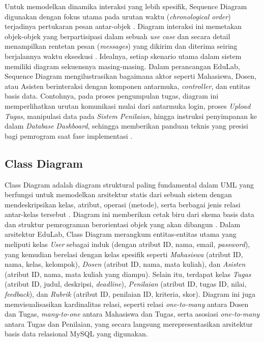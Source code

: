\documentclass[12pt,a4paper,twoside]{report}
\begin{document}
Untuk memodelkan dinamika interaksi yang lebih spesifik, Sequence Diagram digunakan dengan fokus utama pada urutan waktu (\textit{chronological order}) terjadinya pertukaran pesan antar-objek \cite{fowler2004}. Diagram interaksi ini memetakan objek-objek yang berpartisipasi dalam sebuah \textit{use case} dan secara detail menampilkan rentetan pesan (\textit{messages}) yang dikirim dan diterima seiring berjalannya waktu ekseskusi \cite{dennis2015}. Idealnya, setiap skenario utama dalam sistem memiliki diagram sekuensnya masing-masing. Dalam perancangan EduLab, Sequence Diagram mengilustrasikan bagaimana aktor seperti Mahasiswa, Dosen, atau Asisten berinteraksi dengan komponen antarmuka, \textit{controller}, dan entitas basis data. Contohnya, pada proses pengumpulan tugas, diagram ini memperlihatkan urutan komunikasi mulai dari antarmuka login, proses \textit{Upload Tugas}, manipulasi data pada \textit{Sistem Penilaian}, hingga instruksi penyimpanan ke dalam \textit{Database} \textit{Dashboard}, sehingga memberikan panduan teknis yang presisi bagi pemrogram saat fase implementasi \cite{valdez2018}.

\subsection{Class Diagram}

Class Diagram adalah diagram struktural paling fundamental dalam UML yang berfungsi untuk memodelkan arsitektur statis dari sebuah sistem dengan mendeskripsikan kelas, atribut, operasi (metode), serta berbagai jenis relasi antar-kelas tersebut \cite{booch2005}. Diagram ini memberikan cetak biru dari skema basis data dan struktur pemrograman berorientasi objek yang akan dibangun \cite{dennis2015}. Dalam arsitektur EduLab, Class Diagram merangkum entitas-entitas utama yang meliputi kelas \textit{User} sebagai induk (dengan atribut ID, nama, email, \textit{password}), yang kemudian berelasi dengan kelas spesifik seperti \textit{Mahasiswa} (atribut ID, nama, kelas, kelompok), \textit{Dosen} (atribut ID, nama, mata kuliah), dan \textit{Asisten} (atribut ID, nama, mata kuliah yang diampu). Selain itu, terdapat kelas \textit{Tugas} (atribut ID, judul, deskripsi, \textit{deadline}), \textit{Penilaian} (atribut ID, tugas ID, nilai, \textit{feedback}), dan \textit{Rubrik} (atribut ID, penilaian ID, kriteria, skor). Diagram ini juga memvisualisasikan kardinalitas relasi, seperti relasi \textit{one-to-many} antara Dosen dan Tugas, \textit{many-to-one} antara Mahasiswa dan Tugas, serta asosiasi \textit{one-to-many} antara Tugas dan Penilaian, yang secara langsung merepresentasikan arsitektur basis data relasional MySQL yang digunakan.
\end{document}
